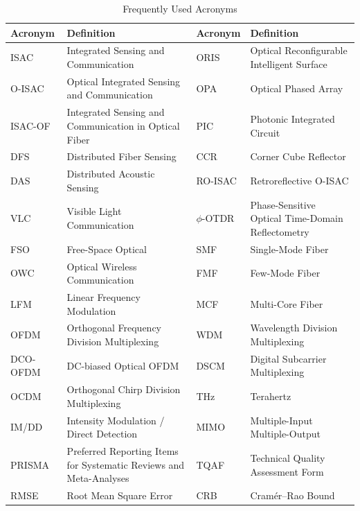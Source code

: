 \begin{table}[!t]
\caption{Frequently Used Acronyms}
\label{tab:intro-acronyms}
\centering
\footnotesize
\begin{tabularx}{\textwidth}{>{\raggedright\arraybackslash}p{} Y >{\raggedright\arraybackslash}p{0.18\textwidth} Y}
\toprule
\textbf{Acronym} & \textbf{Definition} & \textbf{Acronym} & \textbf{Definition} \\
\midrule
ISAC & Integrated Sensing and Communication & ORIS & Optical Reconfigurable Intelligent Surface \\
O-ISAC & Optical Integrated Sensing and Communication & OPA & Optical Phased Array \\
ISAC-OF & Integrated Sensing and Communication in Optical Fiber & PIC & Photonic Integrated Circuit \\
DFS & Distributed Fiber Sensing & CCR & Corner Cube Reflector \\
DAS & Distributed Acoustic Sensing & RO-ISAC & Retroreflective O-ISAC \\
VLC & Visible Light Communication & $\phi$-OTDR & Phase-Sensitive Optical Time-Domain Reflectometry \\
FSO & Free-Space Optical & SMF & Single-Mode Fiber \\
OWC & Optical Wireless Communication & FMF & Few-Mode Fiber \\
LFM & Linear Frequency Modulation & MCF & Multi-Core Fiber \\
OFDM & Orthogonal Frequency Division Multiplexing & WDM & Wavelength Division Multiplexing \\
DCO-OFDM & DC-biased Optical OFDM & DSCM & Digital Subcarrier Multiplexing \\
OCDM & Orthogonal Chirp Division Multiplexing & THz & Terahertz \\
IM/DD & Intensity Modulation / Direct Detection & MIMO & Multiple-Input Multiple-Output \\
PRISMA & Preferred Reporting Items for Systematic Reviews and Meta-Analyses & TQAF & Technical Quality Assessment Form \\
RMSE & Root Mean Square Error & CRB & Cram\'er--Rao Bound \\
\bottomrule
\end{tabularx}
\end{table}
